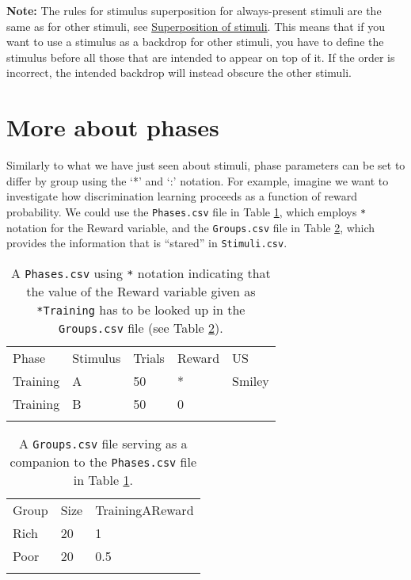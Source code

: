 \documentclass[11pt,]{article}
\renewcommand{\medskip}{}
\begin{document}
\textbf{Note:} The rules for stimulus superposition for always-present
stimuli are the same as for other stimuli, see
\hyperref[stimulus-superposition]{Superposition of stimuli}. This means
that if you want to use a stimulus as a backdrop for other stimuli, you
have to define the stimulus before all those that are intended to appear
on top of it. If the order is incorrect, the intended backdrop will
instead obscure the other stimuli.

\section{More about phases}

Similarly to what we have just seen about stimuli, phase parameters can
be set to differ by group using the `*' and `:' notation. For example,
imagine we want to investigate how discrimination learning proceeds as a
function of reward probability. We could use the \texttt{Phases.csv}
file in Table \ref{phases-star-notation}, which employs \texttt{*}
notation for the Reward variable, and the \texttt{Groups.csv} file in
Table \ref{groups-phases-star-notation}, which provides the information
that is ``stared'' in \texttt{Stimuli.csv}.

\begin{longtable}[c]{@{}lllll@{}}
\hline\noalign{\medskip}
Phase & Stimulus & Trials & Reward & US
\\\noalign{\medskip}
\hline\noalign{\medskip}
Training & A & 50 & * & Smiley
\\\noalign{\medskip}
Training & B & 50 & 0 &
\\\noalign{\medskip}
\hline
\noalign{\medskip}
\caption{A \texttt{Phases.csv} using \texttt{*} notation indicating that
the value of the Reward variable given as \texttt{*Training} has to be
looked up in the \texttt{Groups.csv} file (see Table
\ref{groups-phases-star-notation}). \label{phases-star-notation}}
\end{longtable}

\begin{longtable}[c]{@{}lll@{}}
\hline\noalign{\medskip}
Group & Size & TrainingAReward
\\\noalign{\medskip}
\hline\noalign{\medskip}
Rich & 20 & 1
\\\noalign{\medskip}
Poor & 20 & 0.5
\\\noalign{\medskip}
\hline
\noalign{\medskip}
\caption{A \texttt{Groups.csv} file serving as a companion to the
\texttt{Phases.csv} file in Table \ref{phases-star-notation}.
\label{groups-phases-star-notation}}
\end{longtable}
\end{document}
